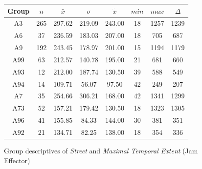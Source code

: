 \begin{figure}[ht!]
	\centering
	\begin{minipage}{0.5\textwidth}
		\tiny
		\setlength{\tabcolsep}{4pt}
		\centering
		\begin{tabular}{c|c|c|c|c|c|c|c}
			\toprule
			Group & $n$ & $\bar{x}$ & $\sigma$ & $\tilde{x}$ & $min$ & $max$ & $\Delta$ \\
			\midrule
			A3   & 265 & 297.62 & 219.09 & 243.00 & 18 & 1257 & 1239 \\ 
			A6   & 37  & 236.59 & 183.03 & 207.00 & 18 & 705  & 687  \\ 
			A9   & 192 & 243.45 & 178.97 & 201.00 & 15 & 1194 & 1179 \\ 
			A99  & 63  & 212.57 & 140.78 & 195.00 & 21 & 681  & 660  \\ 
			A93  & 12  & 212.00 & 187.74 & 130.50 & 39 & 588  & 549  \\ 
			A94  & 14  & 109.71 & 56.07  & 97.50  & 42 & 249  & 207  \\ 
			A7   & 35  & 254.66 & 306.21 & 168.00 & 42 & 1341 & 1299 \\ 
			A73  & 52  & 157.21 & 179.42 & 130.50 & 18 & 1323 & 1305 \\ 
			A96  & 41  & 155.85 & 84.33  & 144.00 & 30 & 381  & 351  \\ 
			A92  & 21  & 134.71 & 82.25  & 138.00 & 18 & 354  & 336  \\ 
			\bottomrule
		\end{tabular}
		\label{tbl:descriptives_baysis_effector_Street_TMax}
	\end{minipage}%
	\begin{minipage}{0.55\textwidth}
		\tiny
		\centering
		\vfill
		\label{fig:descriptives_baysis_effector_Street_TMax}
	\end{minipage}%
	\caption{Group descriptives of \textit{Street} and \textit{Maximal Temporal Extent} (Jam Effector)}
\end{figure}
